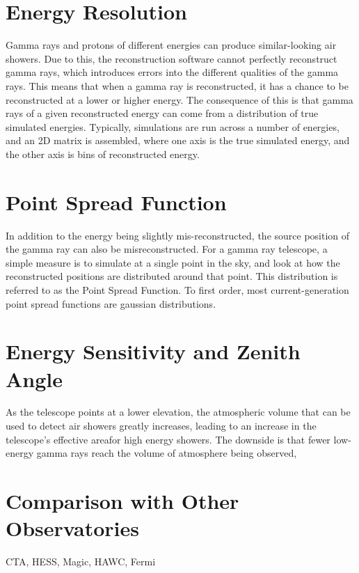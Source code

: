 \section{Energy Resolution}
Gamma rays and protons of different energies can produce similar-looking air showers.
Due to this, the reconstruction software cannot perfectly reconstruct gamma rays, which introduces errors into the different qualities of the gamma rays.
This means that when a gamma ray is reconstructed, it has a chance to be reconstructed at a lower or higher energy.
The consequence of this is that gamma rays of a given reconstructed energy can come from a distribution of true simulated energies.
Typically, simulations are run across a number of energies, and an 2D matrix is assembled, where one axis is the true simulated energy, and the other axis is bins of reconstructed energy.


\section{Point Spread Function}
In addition to the energy being slightly mis-reconstructed, the source position of the gamma ray can also be misreconstructed.
For a gamma ray telescope, a simple measure is to simulate at a single point in the sky, and look at how the reconstructed positions are distributed around that point.
This distribution is referred to as the Point Spread Function.
To first order, most current-generation point spread functions are gaussian distributions.


\section{Energy Sensitivity and Zenith Angle}

As the telescope points at a lower elevation, the atmospheric volume that can be used to detect air showers greatly increases, leading to an increase in the telescope's effective areafor high energy showers.
The downside is that fewer low-energy gamma rays reach the volume of atmosphere being observed, 

\section{Comparison with Other Observatories}


CTA, HESS, Magic, HAWC, Fermi
